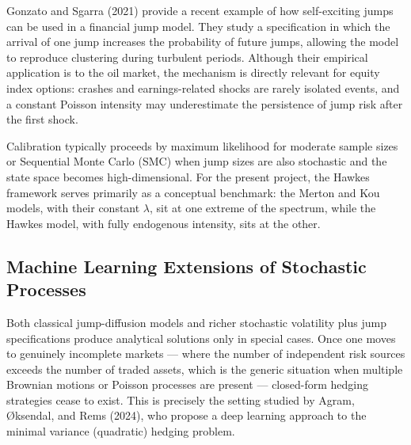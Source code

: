 \documentclass[12pt]{article}
\begin{document}
Gonzato and Sgarra (2021) provide a recent example of how self-exciting jumps can be used in a financial jump model. They study a specification in which the arrival of one jump increases the probability of future jumps, allowing the model to reproduce clustering during turbulent periods. Although their empirical application is to the oil market, the mechanism is directly relevant for equity index options: crashes and earnings-related shocks are rarely isolated events, and a constant Poisson intensity may underestimate the persistence of jump risk after the first shock.

Calibration typically proceeds by maximum likelihood for moderate sample sizes or Sequential Monte Carlo (SMC) when jump sizes are also stochastic and the state space becomes high-dimensional. For the present project, the Hawkes framework serves primarily as a conceptual benchmark: the Merton and Kou models, with their constant $\lambda$, sit at one extreme of the spectrum, while the Hawkes model, with fully endogenous intensity, sits at the other.

\subsection*{Machine Learning Extensions of Stochastic Processes}

Both classical jump-diffusion models and richer stochastic volatility plus jump specifications produce analytical solutions only in special cases. Once one moves to genuinely incomplete markets --- where the number of independent risk sources exceeds the number of traded assets, which is the generic situation when multiple Brownian motions or Poisson processes are present --- closed-form hedging strategies cease to exist. This is precisely the setting studied by Agram, \O{}ksendal, and Rems (2024), who propose a deep learning approach to the minimal variance (quadratic) hedging problem.
\end{document}
